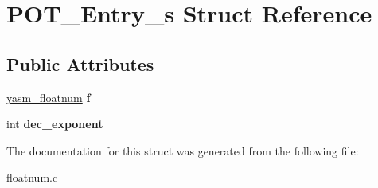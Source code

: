\hypertarget{struct_p_o_t___entry__s}{\section{P\-O\-T\-\_\-\-Entry\-\_\-s Struct Reference}
\label{struct_p_o_t___entry__s}
}
\subsection*{Public Attributes}
\begin{DoxyCompactItemize}
\item 
\hypertarget{struct_p_o_t___entry__s_a5182bca1c19fc0a5ed38051809a8f3d6}{\hyperlink{structyasm__floatnum}{yasm\-\_\-floatnum} {\bfseries f}}\label{struct_p_o_t___entry__s_a5182bca1c19fc0a5ed38051809a8f3d6}

\item 
\hypertarget{struct_p_o_t___entry__s_a62240dcd1bfdc497aac09032dc0c767d}{int {\bfseries dec\-\_\-exponent}}\label{struct_p_o_t___entry__s_a62240dcd1bfdc497aac09032dc0c767d}

\end{DoxyCompactItemize}


The documentation for this struct was generated from the following file\-:\begin{DoxyCompactItemize}
\item 
floatnum.\-c\end{DoxyCompactItemize}
